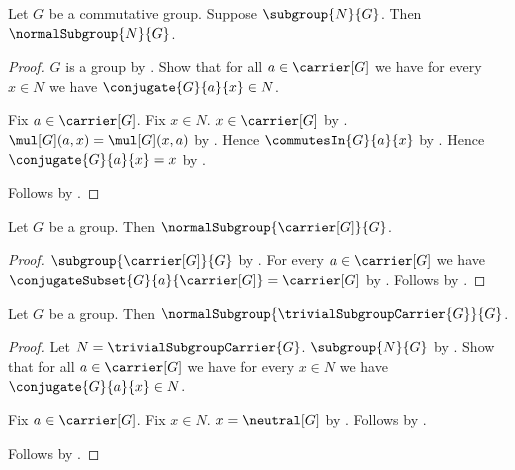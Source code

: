 \begin{theorem}\label{commutative_group_subgroup_is_normal}
    Let $G$ be a commutative group.
    Suppose $\subgroup{N}{G}$.
    Then $\normalSubgroup{N}{G}$.
\end{theorem}
\begin{proof}
    $G$ is a group by .
    Show that for all $a\in\carrier[G]$ we have for every $x\in N$ we have
        $\conjugate{G}{a}{x}\in N$.
    \begin{subproof}
        Fix $a\in\carrier[G]$.
        Fix $x\in N$.
        $x\in\carrier[G]$ by .
        $\mul[G](a,x)=\mul[G](x,a)$ by
            .
        Hence $\commutesIn{G}{a}{x}$ by .
        Hence $\conjugate{G}{a}{x}=x$ by
            .
    \end{subproof}
    Follows by .
\end{proof}

\begin{proposition}\label{full_carrier_normal_subgroup}
    Let $G$ be a group.
    Then $\normalSubgroup{\carrier[G]}{G}$.
\end{proposition}
\begin{proof}
    $\subgroup{\carrier[G]}{G}$ by
        .
    For every $a\in\carrier[G]$ we have
        $\conjugateSubset{G}{a}{\carrier[G]}=\carrier[G]$ by
        .
    Follows by .
\end{proof}

\begin{proposition}\label{trivial_carrier_normal_subgroup}
    Let $G$ be a group.
    Then $\normalSubgroup{\trivialSubgroupCarrier{G}}{G}$.
\end{proposition}
\begin{proof}
    Let $N=\trivialSubgroupCarrier{G}$.
    $\subgroup{N}{G}$ by .
    Show that for all $a\in\carrier[G]$ we have for every $x\in N$
        we have $\conjugate{G}{a}{x}\in N$.
    \begin{subproof}
        Fix $a\in\carrier[G]$.
        Fix $x\in N$.
        $x=\neutral[G]$ by
            .
        Follows by
            .
    \end{subproof}
    Follows by .
\end{proof}

